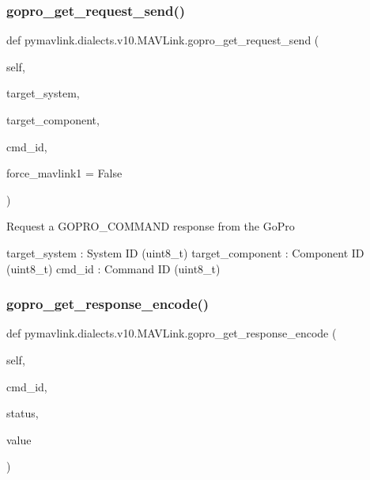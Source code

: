 \begin{DoxyVerb}
\begin{DoxyVerb}
\subsubsection{\texorpdfstring{gopro\+\_\+get\+\_\+request\+\_\+send()}{gopro\_get\_request\_send()}}
{\footnotesize\ttfamily def pymavlink.\+dialects.\+v10.\+M\+A\+V\+Link.\+gopro\+\_\+get\+\_\+request\+\_\+send (\begin{DoxyParamCaption}\item[{}]{self,  }\item[{}]{target\+\_\+system,  }\item[{}]{target\+\_\+component,  }\item[{}]{cmd\+\_\+id,  }\item[{}]{force\+\_\+mavlink1 = {\ttfamily False} }\end{DoxyParamCaption})}

\begin{DoxyVerb}Request a GOPRO_COMMAND response from the GoPro

target_system             : System ID (uint8_t)
target_component          : Component ID (uint8_t)
cmd_id                    : Command ID (uint8_t)\end{DoxyVerb}
 \mbox{\label{classpymavlink_1_1dialects_1_1v10_1_1MAVLink_a348017e26e757084a726a3a008a3d898}} 
\subsubsection{\texorpdfstring{gopro\+\_\+get\+\_\+response\+\_\+encode()}{gopro\_get\_response\_encode()}}
{\footnotesize\ttfamily def pymavlink.\+dialects.\+v10.\+M\+A\+V\+Link.\+gopro\+\_\+get\+\_\+response\+\_\+encode (\begin{DoxyParamCaption}\item[{}]{self,  }\item[{}]{cmd\+\_\+id,  }\item[{}]{status,  }\item[{}]{value }\end{DoxyParamCaption})}


\end{DoxyVerb}
\end{DoxyVerb}
